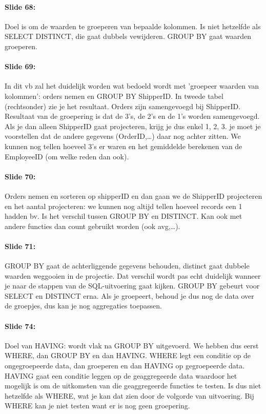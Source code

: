 \documentclass[10pt,a4paper]{report}
\begin{document}
\paragraph{Slide 68:}Doel is om de waarden te groeperen van bepaalde kolommen. Is niet hetzelfde als SELECT DISTINCT, die gaat dubbels vewijderen. GROUP BY gaat waarden groeperen.

\paragraph{Slide 69:}In dit vb zal het duidelijk worden wat bedoeld wordt met 'groepeer waarden van kolommen': orders nemen en GROUP BY ShipperID. In tweede tabel (rechtsonder) zie je het resultaat. Orders zijn samengevoegd bij ShipperID. Resultaat van de groepering is dat de 3's, de 2's en de 1's worden samengevoegd. Als je dan alleen ShipperID gaat projecteren, krijg je dus enkel 1, 2, 3. je moet je voorstellen dat de andere gegevens (OrderID,…) daar nog achter zitten. We kunnen nog tellen hoeveel 3's er waren en het gemiddelde berekenen van de EmployeeID (om welke reden dan ook).

\paragraph{Slide 70:}Orders nemen en sorteren op shipperID en dan gaan we de ShipperID projecteren en het aantal projecteren: we kunnen nog altijd tellen hoeveel records een 1 hadden bv. Is het verschil tussen GROUP BY en DISTINCT. Kan ook met andere functies dan count gebruikt worden (ook avg,…).

\paragraph{Slide 71:}GROUP BY gaat de achterliggende gegevens behouden, distinct gaat dubbele waarden weggooien in de projectie. Dat verschil wordt pas echt duidelijk wanneer je naar de stappen van de SQL-uitvoering gaat kijken. GROUP BY gebeurt voor SELECT en DISTINCT erna. Als je groepeert, behoud je dus nog de data over de groepjes, dus kan je nog aggregaties toepassen.

\paragraph{Slide 74:}Doel van HAVING: wordt vlak na GROUP BY uitgevoerd. We hebben dus eerst WHERE, dan GROUP BY en dan HAVING. WHERE legt een conditie op de ongegroepeerde data, dan groeperen en dan HAVING op gegroepeerde data. HAVING gaat een conditie leggen op de geaggregeerde data waardoor het mogelijk is om de uitkomsten van die geaggregeerde functies te testen. Is dus niet hetzelfde als WHERE, wat je kan dat zien door de volgorde van uitvoering. Bij WHERE kan je niet testen want er is nog geen groepering.
\end{document}
